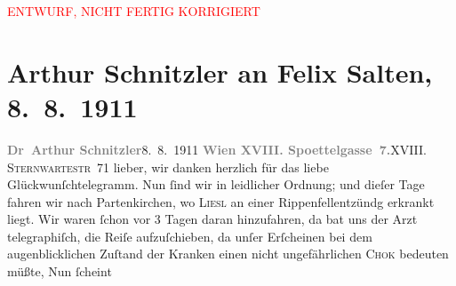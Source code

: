 
\begin{center}
            \textcolor{red}{ENTWURF, NICHT FERTIG KORRIGIERT}
                      \end{center}
            
         
         \renewcommand{\erwaehntePersonen}{Personen:  ?? [Arzt von Elisabeth Steinrück], Samuel Fischer, Hedwig Fischer, Felix Salten, Elisabeth Steinrück}
         \renewcommand{\erwaehnteOrte}{Orte: Edmund-Weiß-Gasse, Partenkirchen, Salzkammergut, Sternwartestraße, Unterach am Attersee, Wien}
         \renewcommand{\erwaehnteWerke}{Werke: Olga Frohgemuth. Erzählung}
               \section[Arthur Schnitzler an Felix Salten, 8. 8. 1911]{ Arthur Schnitzler an Felix Salten, 8. 8. 1911}\nopagebreak{}\rehead{ }\begin{ledgroupsized}[t]{13cm}\normalsize\beginnumbering \toendnotes[C]{\smallbreak\pagebreak[2]} 
\toendnotes[C]{\smallbreak}\pstart
           \noindent{}{\pb}\textcolor{gray}{\textbf{Dr Arthur Schnitzler}}\hfill 8. 8. 1911\pend
           \pstart
           \textcolor{gray}{\textbf{Wien XVIII.
                           Spoettelgasse 7.}}\hfill \textsc{XVIII. Sternwartestr 71}\pend
           \pstart
           lieber, wir danken herzlich für das liebe Glückwunſchtelegramm. Nun
               ſind wir in leidlicher Ordnung; und dieſer Tage fahren wir nach Partenkirchen, wo \textsc{Liesl} an einer Rippenfellentzündg erkrankt liegt. Wir waren ſchon vor 3 Tagen daran
               hinzufahren, {\pb}da bat uns der Arzt telegraphiſch, die
               Reiſe aufzuſchieben, da unſer Erſcheinen bei dem augenblicklichen Zuſtand der Kranken
               einen nicht ungefährlichen \textsc{Chok} bedeuten müßte, Nun ſcheint

\end{ledgroupsized}
